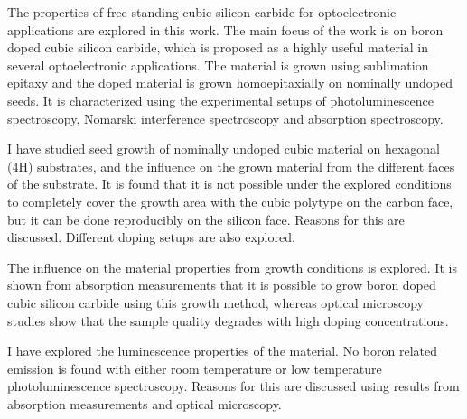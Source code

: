 The properties of free-standing cubic silicon carbide for optoelectronic applications are explored in this work. The main focus of the work is on boron doped cubic silicon carbide, which is proposed as a highly useful material in several optoelectronic applications. The material is grown using sublimation epitaxy and the doped material is grown homoepitaxially on nominally undoped seeds. It is characterized using the experimental setups of photoluminescence spectroscopy, Nomarski interference spectroscopy and absorption spectroscopy. 

I have studied seed growth of nominally undoped cubic material on hexagonal (4H) substrates, and the influence on the grown material from the different faces of the substrate. It is found that it is not possible under the explored conditions to completely cover the growth area with the cubic polytype on the carbon face, but it can be done reproducibly on the silicon face. Reasons for this are discussed. Different doping setups are also explored.

The influence on the material properties from growth conditions is explored. It is shown from absorption measurements that it is possible to grow boron doped cubic silicon carbide using this growth method, whereas optical microscopy studies show that the sample quality degrades with high doping concentrations. 

I have explored the luminescence properties of the material. No boron related emission is found with either room temperature or low temperature photoluminescence spectroscopy. Reasons for this are discussed using results from absorption measurements and optical microscopy. 

